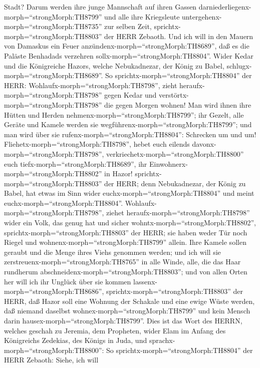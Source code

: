 Stadt?  Darum werden ihre junge Mannschaft auf ihren Gassen
darniederliegenx-morph=``strongMorph:TH8799'' und alle ihre Kriegsleute
untergehenx-morph=``strongMorph:TH8735'' zur selben Zeit,
sprichtx-morph=``strongMorph:TH8803'' der HERR Zebaoth. 
Und ich will in den Mauern von Damaskus ein Feuer
anzündenx-morph=``strongMorph:TH8689'', daß es die Paläste Benhadads
verzehren sollx-morph=``strongMorph:TH8804''.  Wider Kedar
und die Königreiche Hazors, welche Nebukadnezar, der König zu Babel,
schlugx-morph=``strongMorph:TH8689''. So
sprichtx-morph=``strongMorph:TH8804'' der HERR:
Wohlaufx-morph=``strongMorph:TH8798'', zieht
heraufx-morph=``strongMorph:TH8798'' gegen Kedar und
verstörtx-morph=``strongMorph:TH8798'' die gegen Morgen wohnen!
 Man wird ihnen ihre Hütten und Herden
nehmenx-morph=``strongMorph:TH8799''; ihr Gezelt, alle Geräte und Kamele
werden sie wegführenx-morph=``strongMorph:TH8799''; und man wird über
sie rufenx-morph=``strongMorph:TH8804'': Schrecken um und um!
 Fliehetx-morph=``strongMorph:TH8798'', hebet euch eilends
davonx-morph=``strongMorph:TH8798'',
verkriechetx-morph=``strongMorph:TH8800'' euch
tiefx-morph=``strongMorph:TH8689'', ihr
Einwohnerx-morph=``strongMorph:TH8802'' in Hazor!
sprichtx-morph=``strongMorph:TH8803'' der HERR; denn Nebukadnezar, der
König zu Babel, hat etwas im Sinn wider
euchx-morph=``strongMorph:TH8804'' und meint
euchx-morph=``strongMorph:TH8804''. 
Wohlaufx-morph=``strongMorph:TH8798'', ziehet
heraufx-morph=``strongMorph:TH8798'' wider ein Volk, das genug hat und
sicher wohntx-morph=``strongMorph:TH8802'',
sprichtx-morph=``strongMorph:TH8803'' der HERR; sie haben weder Tür noch
Riegel und wohnenx-morph=``strongMorph:TH8799'' allein. 
Ihre Kamele sollen geraubt und die Menge ihres Viehs genommen werden;
und ich will sie zerstreuenx-morph=``strongMorph:TH8765'' in alle Winde,
alle, die das Haar rundherum abschneidenx-morph=``strongMorph:TH8803'';
und von allen Orten her will ich ihr Unglück über sie kommen
lassenx-morph=``strongMorph:TH8686'',
sprichtx-morph=``strongMorph:TH8803'' der HERR,  daß Hazor
soll eine Wohnung der Schakale und eine ewige Wüste werden, daß niemand
daselbst wohnex-morph=``strongMorph:TH8799'' und kein Mensch darin
hausex-morph=``strongMorph:TH8799''.  Dies ist das Wort des
HERRN, welches geschah zu Jeremia, dem Propheten, wider Elam im Anfang
des Königreichs Zedekias, des Königs in Juda, und
sprachx-morph=``strongMorph:TH8800'':  So
sprichtx-morph=``strongMorph:TH8804'' der HERR Zebaoth: Siehe, ich will
